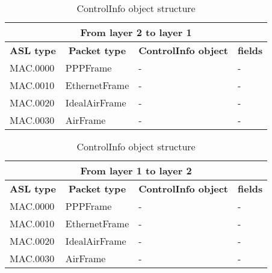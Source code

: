 \begin{table}
\centering
\ttfamily
\footnotesize
\caption{ControlInfo object structure}
\label{tab:from4-to5}
\begin{tabular}{|l|l|l|l|}
\hline
\multicolumn{4}{|c|}{\normalfont\textbf{From layer 2 to layer 1}}	\\
\hline
\multicolumn{1}{|c|}{\normalfont\textbf{ASL type}}	&\multicolumn{1}{c|}{\normalfont\textbf{Packet type}}		&\multicolumn{1}{c|}{\normalfont\textbf{ControlInfo object}}		&\multicolumn{1}{c|}{\normalfont\textbf{fields}}\\
\hline
\multirow{1}{*}{MAC.0000}&\multirow{1}{*}{PPPFrame}		&-	&-	\\
\hline
\multirow{1}{*}{MAC.0010}&\multirow{1}{*}{EthernetFrame}	&-	&-	\\
\hline
\multirow{1}{*}{MAC.0020}&\multirow{1}{*}{IdealAirFrame}		&-	&-	\\
\hline
\multirow{1}{*}{MAC.0030}&\multirow{1}{*}{AirFrame}		&-	&-	\\
\hline
\end{tabular}
\end{table}
%
\begin{table}
\centering
\ttfamily
\footnotesize
\caption{ControlInfo object structure}
\label{tab:from4-to5}
\begin{tabular}{|l|l|l|l|}
\hline
\multicolumn{4}{|c|}{\normalfont\textbf{From layer 1 to layer 2}}	\\
\hline
\multicolumn{1}{|c|}{\normalfont\textbf{ASL type}}	&\multicolumn{1}{c|}{\normalfont\textbf{Packet type}}		&\multicolumn{1}{c|}{\normalfont\textbf{ControlInfo object}}		&\multicolumn{1}{c|}{\normalfont\textbf{fields}}\\
\hline
\multirow{1}{*}{MAC.0000}&\multirow{1}{*}{PPPFrame}		&-	&-	\\
\hline
\multirow{1}{*}{MAC.0010}&\multirow{1}{*}{EthernetFrame}	&-	&-	\\
\hline
\multirow{1}{*}{MAC.0020}&\multirow{1}{*}{IdealAirFrame}		&-	&-	\\
\hline
\multirow{1}{*}{MAC.0030}&\multirow{1}{*}{AirFrame}		&-	&-	\\
\hline
\end{tabular}
\end{table}









